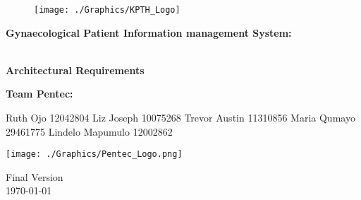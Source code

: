 \begin{titlepage}
	\begin{center}
		
		\begin{figure}[t]
			\centering
			\texttt{[image: ./Graphics/KPTH\_Logo]}
		\end{figure}		
		
		\textbf{\LARGE Gynaecological Patient Information
		management System:}
		
		\vspace{1 cm}
	    \textbf{\LARGE \\Architectural Requirements}
		
		\vspace{1 cm}
		\LARGE{\textbf{Team Pentec: }}
		

		\begin{flushright} \large
			
			Ruth Ojo 12042804\newline
			Liz Joseph 10075268\newline
			Trevor Austin 11310856\newline
			Maria Qumayo 29461775\newline
			Lindelo Mapumulo 12002862\newline
		\end{flushright}
		
				\vspace{1 cm}
				\centering
				\texttt{[image: ./Graphics/Pentec\_Logo.png]}

		
		
		{\LARGE Final Version}
		\\
		{\large \today}		
		
		
	\end{center}
\end{titlepage}
